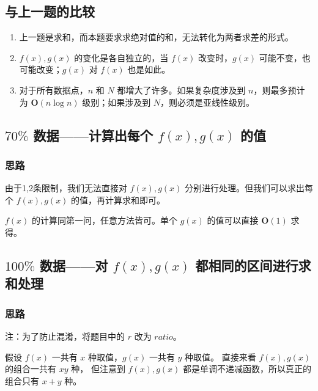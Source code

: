 
% 

\subsection{与上一题的比较}

\begin{enumerate}
    \item 上一题是求和，而本题要求求绝对值的和，无法转化为两者求差的形式。
    \item $f(x),g(x)$ 的变化是各自独立的，当 $f(x)$ 改变时，$g(x)$ 可能不变，也可能改变；$g(x)$ 对 $f(x)$ 也是如此。
    \item 对于所有数据点，$n$ 和 $N$ 都增大了许多。如果复杂度涉及到 $n$，则最多预计为 $\mathbf{O}(n\log n)$ 级别；如果涉及到 $N$，则必须是亚线性级别。
\end{enumerate}

\subsection{\texorpdfstring{$70\%$}{70\%} 数据——计算出每个 \texorpdfstring{$f(x),g(x)$}{f(x),g(x)} 的值}

\subsubsection{思路}

由于1,2条限制，我们无法直接对 $f(x),g(x)$ 分别进行处理。但我们可以求出每个 $f(x),g(x)$ 的值，再计算求和即可。

$f(x)$ 的计算同第一问，任意方法皆可。单个 $g(x)$ 的值可以直接 $\mathbf{O}(1)$ 求得。

\subsection{\texorpdfstring{$100\%$}{100\%} 数据——对 \texorpdfstring{$f(x),g(x)$}{f(x),g(x)} 都相同的区间进行求和处理}

\subsubsection{思路}

注：为了防止混淆，将题目中的 $r$ 改为 $ratio$。

假设 $f(x)$ 一共有 $x$ 种取值，$g(x)$ 一共有 $y$ 种取值。
直接来看 $f(x),g(x)$ 的组合一共有 $xy$ 种，
但注意到 $f(x),g(x)$ 都是单调不递减函数，所以真正的组合只有 $x+y$ 种。


